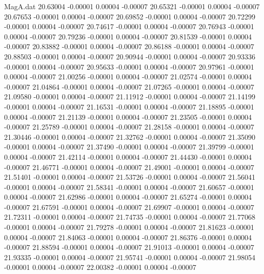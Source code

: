 \begin{filecontents}{MagA.dat}
  20.63004   -0.00001    0.00004   -0.00007
  20.65321   -0.00001    0.00004   -0.00007
  20.67653   -0.00001    0.00004   -0.00007
  20.69852   -0.00001    0.00004   -0.00007
  20.72299   -0.00001    0.00004   -0.00007
  20.74617   -0.00001    0.00004   -0.00007
  20.76943   -0.00001    0.00004   -0.00007
  20.79236   -0.00001    0.00004   -0.00007
  20.81539   -0.00001    0.00004   -0.00007
  20.83882   -0.00001    0.00004   -0.00007
  20.86188   -0.00001    0.00004   -0.00007
  20.88503   -0.00001    0.00004   -0.00007
  20.90944   -0.00001    0.00004   -0.00007
  20.93336   -0.00001    0.00004   -0.00007
  20.95633   -0.00001    0.00004   -0.00007
  20.97961   -0.00001    0.00004   -0.00007
  21.00256   -0.00001    0.00004   -0.00007
  21.02574   -0.00001    0.00004   -0.00007
  21.04864   -0.00001    0.00004   -0.00007
  21.07265   -0.00001    0.00004   -0.00007
  21.09580   -0.00001    0.00004   -0.00007
  21.11912   -0.00001    0.00004   -0.00007
  21.14199   -0.00001    0.00004   -0.00007
  21.16531   -0.00001    0.00004   -0.00007
  21.18895   -0.00001    0.00004   -0.00007
  21.21139   -0.00001    0.00004   -0.00007
  21.23505   -0.00001    0.00004   -0.00007
  21.25789   -0.00001    0.00004   -0.00007
  21.28158   -0.00001    0.00004   -0.00007
  21.30446   -0.00001    0.00004   -0.00007
  21.32762   -0.00001    0.00004   -0.00007
  21.35090   -0.00001    0.00004   -0.00007
  21.37490   -0.00001    0.00004   -0.00007
  21.39799   -0.00001    0.00004   -0.00007
  21.42114   -0.00001    0.00004   -0.00007
  21.44430   -0.00001    0.00004   -0.00007
  21.46771   -0.00001    0.00004   -0.00007
  21.49001   -0.00001    0.00004   -0.00007
  21.51401   -0.00001    0.00004   -0.00007
  21.53726   -0.00001    0.00004   -0.00007
  21.56041   -0.00001    0.00004   -0.00007
  21.58341   -0.00001    0.00004   -0.00007
  21.60657   -0.00001    0.00004   -0.00007
  21.62986   -0.00001    0.00004   -0.00007
  21.65274   -0.00001    0.00004   -0.00007
  21.67591   -0.00001    0.00004   -0.00007
  21.69907   -0.00001    0.00004   -0.00007
  21.72311   -0.00001    0.00004   -0.00007
  21.74735   -0.00001    0.00004   -0.00007
  21.77068   -0.00001    0.00004   -0.00007
  21.79278   -0.00001    0.00004   -0.00007
  21.81623   -0.00001    0.00004   -0.00007
  21.84063   -0.00001    0.00004   -0.00007
  21.86376   -0.00001    0.00004   -0.00007
  21.88594   -0.00001    0.00004   -0.00007
  21.91013   -0.00001    0.00004   -0.00007
  21.93335   -0.00001    0.00004   -0.00007
  21.95741   -0.00001    0.00004   -0.00007
  21.98054   -0.00001    0.00004   -0.00007
  22.00382   -0.00001    0.00004   -0.00007

\end{filecontents}
